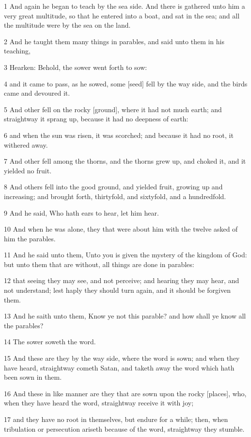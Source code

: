 \par 1 And again he began to teach by the sea side. And there is gathered unto him a very great multitude, so that he entered into a boat, and sat in the sea; and all the multitude were by the sea on the land.
\par 2 And he taught them many things in parables, and said unto them in his teaching,
\par 3 Hearken: Behold, the sower went forth to sow:
\par 4 and it came to pass, as he sowed, some [seed] fell by the way side, and the birds came and devoured it.
\par 5 And other fell on the rocky [ground], where it had not much earth; and straightway it sprang up, because it had no deepness of earth:
\par 6 and when the sun was risen, it was scorched; and because it had no root, it withered away.
\par 7 And other fell among the thorns, and the thorns grew up, and choked it, and it yielded no fruit.
\par 8 And others fell into the good ground, and yielded fruit, growing up and increasing; and brought forth, thirtyfold, and sixtyfold, and a hundredfold.
\par 9 And he said, Who hath ears to hear, let him hear.
\par 10 And when he was alone, they that were about him with the twelve asked of him the parables.
\par 11 And he said unto them, Unto you is given the mystery of the kingdom of God: but unto them that are without, all things are done in parables:
\par 12 that seeing they may see, and not perceive; and hearing they may hear, and not understand; lest haply they should turn again, and it should be forgiven them.
\par 13 And he saith unto them, Know ye not this parable? and how shall ye know all the parables?
\par 14 The sower soweth the word.
\par 15 And these are they by the way side, where the word is sown; and when they have heard, straightway cometh Satan, and taketh away the word which hath been sown in them.
\par 16 And these in like manner are they that are sown upon the rocky [places], who, when they have heard the word, straightway receive it with joy;
\par 17 and they have no root in themselves, but endure for a while; then, when tribulation or persecution ariseth because of the word, straightway they stumble.
